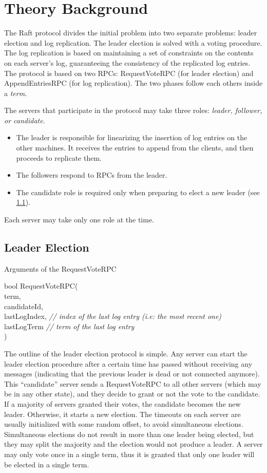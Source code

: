 \section{Theory Background}
\label{background}

The Raft protocol divides the initial problem into two separate problems: leader election and log replication. The leader election is solved with a voting procedure. The log replication is based on maintaining a set of constraints on the contents on each server's log, guaranteeing the consistency of the replicated log entries. The protocol is based on two RPCs: RequestVoteRPC (for leader election) and AppendEntriesRPC (for log replication). The two phases follow each others inside a \emph{term}.

The servers that participate in the protocol may take three roles: \emph{leader, follower, or candidate}. 
\begin{itemize}
    \item The leader is responsible for linearizing the insertion of log entries on the other machines. It receives the entries to append from the clients, and then proceeds to replicate them.
    \item The followers respond to RPCs from the leader.
    \item The candidate role is required only when preparing to elect a new leader (see \ref{leader-election}).
\end{itemize}
Each server may take only one role at the time.
\subsection{Leader Election}
\label{leader-election}
\begin{algorithm}[ht]
\caption{Arguments of the RequestVoteRPC}
\label{algo-requestVote-arguments}
bool RequestVoteRPC( \\
    term, \\
    candidateId, \\ 
    lastLogIndex, \emph{// index of the last log entry (i.e: the most recent one)}\\
    lastLogTerm   \emph{// term of the last log entry}\\
    ) \;
\end{algorithm}
The outline of the leader election protocol is simple. Any server can start the leader election procedure after a certain time has passed without receiving any messages (indicating that the previous leader is dead or not connected anymore). This ``candidate'' server sends a RequestVoteRPC to all other servers (which may be in any other state), and they decide to grant or not the vote to the candidate. If a majority of servers granted their votes, the candidate becomes the new leader. Otherwise, it starts a new election. The timeouts on each server are usually initialized with some random offset, to avoid simultaneous elections. Simultaneous elections do not result in more than one leader being elected, but they may split the majority and the election would not produce a leader. A server may only vote once in a single term, thus it is granted that only one leader will be elected in a single term.

